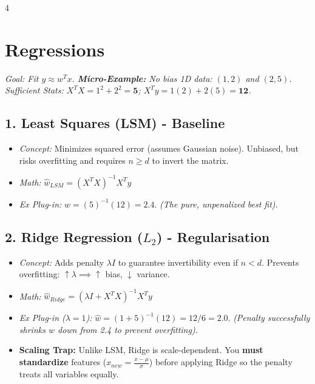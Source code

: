 \documentclass[9pt]{extarticle}
\begin{document}
\begin{multicols*}{4}
\section*{Regressions}
\textit{Goal: Fit $y \approx w^T x$. \textbf{Micro-Example:} No bias 1D data: $(1, 2)$ and $(2, 5)$. \\
Sufficient Stats: $X^T X = 1^2 + 2^2 = \mathbf{5}$; \quad $X^T y = 1(2) + 2(5) = \mathbf{12}$.}

\vspace{0.2cm}
\subsection*{1. Least Squares (LSM) - Baseline}
\begin{itemize}
    \item \textit{Concept:} Minimizes squared error (assumes Gaussian noise). Unbiased, but risks overfitting and requires $n \ge d$ to invert the matrix.
    \item \textit{Math:} $\hat{w}_{LSM} = (X^T X)^{-1} X^T y$ 
    \item \textit{Ex Plug-in:} $\hat{w} = (5)^{-1}(12) = \mathbf{2.4}$. \textit{(The pure, unpenalized best fit).}
\end{itemize}

\subsection*{2. Ridge Regression ($L_2$) - Regularisation}
\begin{itemize}
    \item \textit{Concept:} Adds penalty $\lambda I$ to guarantee invertibility even if $n < d$. Prevents overfitting: $\uparrow \lambda \implies \uparrow$ bias, $\downarrow$ variance.
    \item \textit{Math:} $\hat{w}_{Ridge} = (\lambda I + X^T X)^{-1} X^T y$ 
    \item \textit{Ex Plug-in ($\lambda=1$):} $\hat{w} = (1 + 5)^{-1}(12) = 12/6 = \mathbf{2.0}$. \textit{(Penalty successfully shrinks $w$ down from 2.4 to prevent overfitting).}
    \item \textbf{Scaling Trap:} Unlike LSM, Ridge is scale-dependent. You \textbf{must standardize} features ($x_{new} = \frac{x - \mu}{\sigma}$) before applying Ridge so the penalty treats all variables equally.
\end{itemize}



\end{multicols*}
\end{document}
